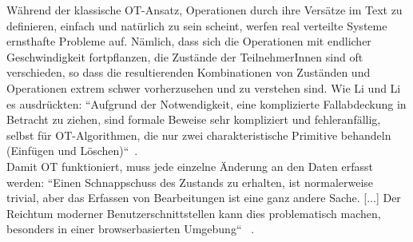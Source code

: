       Während der klassische OT-Ansatz, Operationen durch ihre Versätze im Text zu definieren, einfach und natürlich zu sein scheint, werfen real verteilte Systeme ernsthafte Probleme auf. Nämlich, dass sich die Operationen mit endlicher Geschwindigkeit fortpflanzen, die Zustände der TeilnehmerInnen sind oft verschieden, so dass die resultierenden Kombinationen von Zuständen und Operationen extrem schwer vorherzusehen und zu verstehen sind.
      Wie Li und Li es ausdrückten: ``Aufgrund der Notwendigkeit, eine komplizierte Fallabdeckung in Betracht zu ziehen, sind formale Beweise sehr kompliziert und fehleranfällig, selbst für OT-Algorithmen, die nur zwei charakteristische Primitive behandeln (Einfügen und Löschen)``~\cite{ot-critic}.\\
      Damit OT funktioniert, muss jede einzelne Änderung an den Daten erfasst werden: ``Einen Schnappschuss des Zustands zu erhalten, ist normalerweise trivial, aber das Erfassen von Bearbeitungen ist eine ganz andere Sache. [...] Der Reichtum moderner Benutzerschnittstellen kann dies problematisch machen, besonders in einer browserbasierten Umgebung`` ~\cite{diff_sync}.
